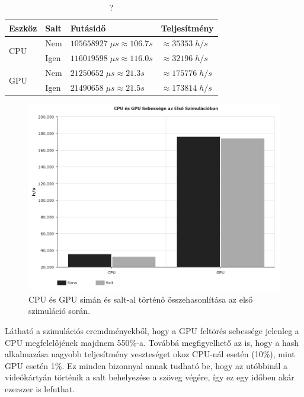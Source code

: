 \begin{table}[H]
    \centering
    \begin{tabular}{l|l|l|l}
        \textbf{Eszköz} & \textbf{Salt} & \textbf{Futásidő} & \textbf{Teljesítmény}  \\
        \hline
        \hline
        \multirow{2}{*}{CPU} & Nem & $\num{105 658 927} \; \mu s \approx \num{106.7}s$ & $\approx \num{35 353} \; h/s$ \\
                             \cline{2-4}
                             & Igen & $\num{116 019 598} \; \mu s \approx \num{116.0}s$ & $\approx \num{32 196} \; h/s$ \\
                             \hline
                             
        \multirow{2}{*}{GPU} & Nem & $\num{21 250 652} \; \mu s \approx \num{21.3}s$ & $\approx \num{175 776} \; h/s$ \\
                             \cline{2-4}
                             & Igen & $\num{21 490 658} \; \mu s \approx \num{21.5}s$ & $\approx \num{173 814} \; h/s$ \\
    \end{tabular}
    \caption{?}
\end{table}


\begin{figure}[H]
    \centering
    \includegraphics[width=\textwidth]{images/charts/performance-1.png}
    \caption{CPU és GPU simán és salt-al történő összehasonlítása az első szimuláció során.}
\end{figure}

Látható a szimulációs eremdményekből, hogy a GPU feltörés sebessége jelenleg a CPU megfelelőjének majdnem 550\%-a. Továbbá megfigyelhető az is, hogy a hash alkalmazása nagyobb teljesítmény veszteséget okoz CPU-nál esetén (10\%), mint GPU esetén 1\%. Ez minden bizonnyal annak tudható be, hogy az utóbbinál a videókártyán történik a salt behelyezése a szöveg végére, így ez egy időben akár ezerszer is lefuthat.

